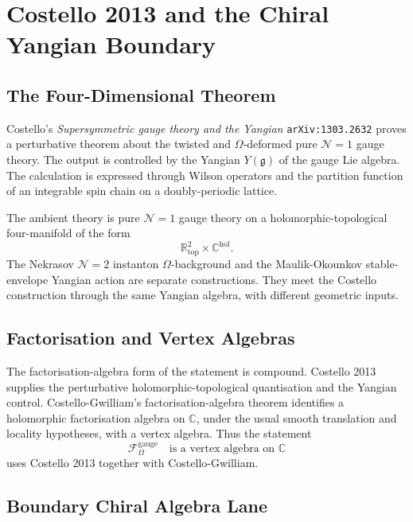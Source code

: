 \section{Costello 2013 and the Chiral Yangian Boundary}
\label{sec:costello-2013-chiral-yangian-boundary}

\providecommand{\kch}{\kappa_{\mathrm{ch}}}
\providecommand{\kcat}{\kappa_{\mathrm{cat}}}
\providecommand{\gghone}{\widehat{\mathfrak{gl}}_1}
\providecommand{\Yplus}{Y^+_{\epsilon_1,\epsilon_2}}
\providecommand{\Fgauge}{\mathcal{F}^{\mathrm{gauge}}_\Omega}

\subsection{The Four-Dimensional Theorem}

Costello's \emph{Supersymmetric gauge theory and the Yangian}
\texttt{arXiv:1303.2632} proves a perturbative theorem about the
twisted and \(\Omega\)-deformed pure \(\mathcal N=1\) gauge theory.  The
output is controlled by the Yangian \(Y(\mathfrak g)\) of the gauge Lie
algebra.  The calculation is expressed through Wilson operators and the
partition function of an integrable spin chain on a doubly-periodic
lattice.

The ambient theory is pure \(\mathcal N=1\) gauge theory on a
holomorphic-topological four-manifold of the form
\[
  \mathbb R^2_{\mathrm{top}}\times \mathbb C^{\mathrm{hol}}.
\]
The Nekrasov \(\mathcal N=2\) instanton \(\Omega\)-background and the
Maulik-Okounkov stable-envelope Yangian action are separate
constructions.  They meet the Costello construction through the same
Yangian algebra, with different geometric inputs.

\subsection{Factorisation and Vertex Algebras}

The factorisation-algebra form of the statement is compound.  Costello
2013 supplies the perturbative holomorphic-topological quantisation and
the Yangian control.  Costello-Gwilliam's factorisation-algebra theorem
identifies a holomorphic factorisation algebra on \(\mathbb C\), under
the usual smooth translation and locality hypotheses, with a vertex
algebra.  Thus the statement
\[
  \Fgauge \quad \text{is a vertex algebra on } \mathbb C
\]
uses Costello 2013 together with Costello-Gwilliam.

\subsection{Boundary Chiral Algebra Lane}


